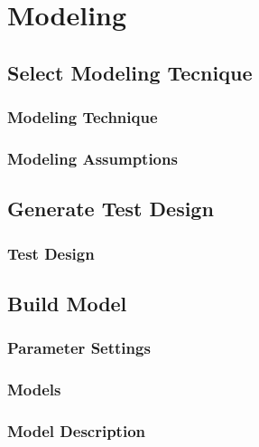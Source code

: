 \chapter{Modeling}

\section{Select Modeling Tecnique}

\subsection{Modeling Technique}

\subsection{Modeling Assumptions}



\section{Generate Test Design}

\subsection{Test Design}


\section{Build Model}

\subsection{Parameter Settings}


\subsection{Models}

\subsection{Model Description}



